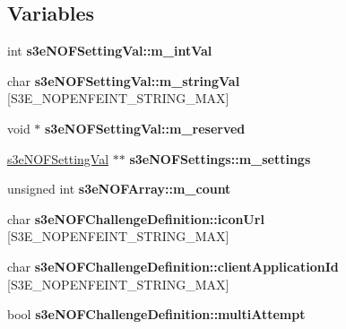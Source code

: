 \subsection*{Variables}
\begin{DoxyCompactItemize}
\item 
\hypertarget{group___n_open_feint_api_group_ga8a04c29667152dbeadff79152b7dbb24}{
int {\bfseries s3eNOFSettingVal::m\_\-intVal}}
\label{group___n_open_feint_api_group_ga8a04c29667152dbeadff79152b7dbb24}

\item 
\hypertarget{group___n_open_feint_api_group_ga9ba119d360def536cc5e03bc76d58cdd}{
char {\bfseries s3eNOFSettingVal::m\_\-stringVal} \mbox{[}S3E\_\-NOPENFEINT\_\-STRING\_\-MAX\mbox{]}}
\label{group___n_open_feint_api_group_ga9ba119d360def536cc5e03bc76d58cdd}

\item 
\hypertarget{group___n_open_feint_api_group_ga6aee3bd956a465ec8553735c8a34f3c2}{
void $\ast$ {\bfseries s3eNOFSettingVal::m\_\-reserved}}
\label{group___n_open_feint_api_group_ga6aee3bd956a465ec8553735c8a34f3c2}

\item 
\hypertarget{group___n_open_feint_api_group_ga02c14e35d772130e5b77cabb7fa73a9b}{
\hyperlink{structs3e_n_o_f_setting_val}{s3eNOFSettingVal} $\ast$$\ast$ {\bfseries s3eNOFSettings::m\_\-settings}}
\label{group___n_open_feint_api_group_ga02c14e35d772130e5b77cabb7fa73a9b}

\item 
\hypertarget{group___n_open_feint_api_group_gaa30bf01aa490f0e36cc36c2b390037f0}{
unsigned int {\bfseries s3eNOFArray::m\_\-count}}
\label{group___n_open_feint_api_group_gaa30bf01aa490f0e36cc36c2b390037f0}

\item 
\hypertarget{group___n_open_feint_api_group_ga65bc3169f033538d31a6fb651d06b998}{
char {\bfseries s3eNOFChallengeDefinition::iconUrl} \mbox{[}S3E\_\-NOPENFEINT\_\-STRING\_\-MAX\mbox{]}}
\label{group___n_open_feint_api_group_ga65bc3169f033538d31a6fb651d06b998}

\item 
\hypertarget{group___n_open_feint_api_group_gab2775b9f11c8112c1ef88f60258bada4}{
char {\bfseries s3eNOFChallengeDefinition::clientApplicationId} \mbox{[}S3E\_\-NOPENFEINT\_\-STRING\_\-MAX\mbox{]}}
\label{group___n_open_feint_api_group_gab2775b9f11c8112c1ef88f60258bada4}

\item 
\hypertarget{group___n_open_feint_api_group_gad637b1a89c05dafbbd74e2cbf36e31d4}{
bool {\bfseries s3eNOFChallengeDefinition::multiAttempt}}
\label{group___n_open_feint_api_group_gad637b1a89c05dafbbd74e2cbf36e31d4}


\end{DoxyCompactItemize}
